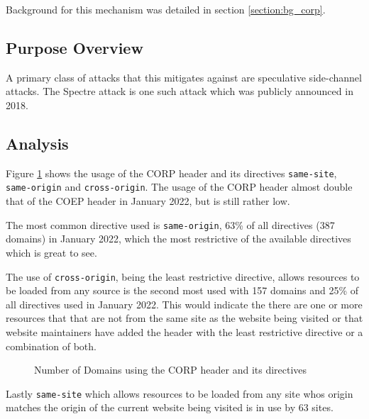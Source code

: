 \documentclass{mscreport}
\begin{document}
Background for this mechanism was detailed in section \ref{section:bg_corp}.

\subsection{Purpose Overview}

\noindent
A primary class of attacks that this mitigates against are speculative side-channel attacks. The Spectre attack \cite{Kocher2019-gv} is one such attack which was publicly announced in 2018.


\subsection{Analysis}

\noindent
Figure \ref{fig:corp_overview} shows the usage of the CORP header and its directives \texttt{same-site}, \texttt{same-origin} and \texttt{cross-origin}. The usage of the CORP header almost double that of the COEP header in January 2022, but is still rather low.

\vspace{0.3cm} \noindent
The most common directive used is \texttt{same-origin}, 63\% of all directives (387 domains) in January 2022, which the most restrictive of the available directives which is great to see.

\vspace{0.3cm} \noindent
The use of \texttt{cross-origin}, being the least restrictive directive, allows resources to be loaded from any source is the second most used with 157 domains and 25\% of all directives used in January 2022. This would indicate the there are one or more resources that that are not from the same site as the website being visited or that website maintainers have added the header with the least restrictive directive or a combination of both.


\clearpage
\newpage


\begin{figure}[t]
	\begin{center}
		\caption{Number of Domains using the CORP header and its directives}
		\label{fig:corp_overview}
	\end{center}
\end{figure}


\vspace{0.3cm} \noindent
Lastly \texttt{same-site} which allows resources to be loaded from any site whos origin matches the origin of the current website being visited is in use by 63 sites.
\end{document}
